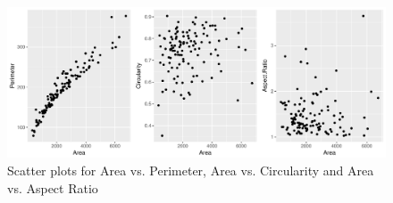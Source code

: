 \documentclass{article}\usepackage[]{graphicx}\usepackage[]{color}
\makeatletter
\def\maxwidth{ %
  \ifdim\Gin@nat@width>\linewidth
    \linewidth
  \else
    \Gin@nat@width
  \fi
}
\newenvironment{knitrout}{}{} %
\numberwithin{figure}{subsection} %
\numberwithin{table}{subsection} %
\makeatother
\begin{document}
\bigbreak
\begin{figure}[!htbp]
  \centering
\begin{knitrout}
\color{fgcolor}
\includegraphics[width=\maxwidth]{figure/unnamed-chunk-1-1} 

\end{knitrout}
  \caption{Scatter plots for Area vs. Perimeter, Area vs. Circularity and Area vs. Aspect Ratio}
  \label{scatter}
\end{figure}

\newpage
\end{document}

